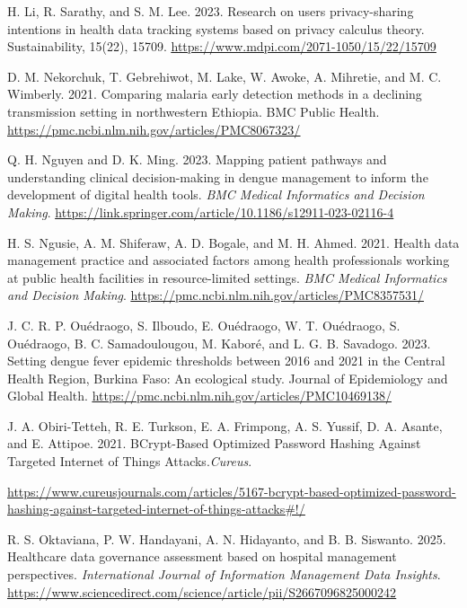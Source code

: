 \documentclass[
]{article}
\begin{document}
H. Li, R. Sarathy, and S. M. Lee. 2023. Research on
users\textquotesingle{} privacy-sharing intentions in health data
tracking systems based on privacy calculus theory. Sustainability,
15(22), 15709.
\href{https://www.mdpi.com/2071-1050/15/22/15709}{\ul{https://www.mdpi.com/2071-1050/15/22/15709}}

D. M. Nekorchuk, T. Gebrehiwot, M. Lake, W. Awoke, A. Mihretie, and M.
C. Wimberly. 2021. Comparing malaria early detection methods in a
declining transmission setting in northwestern Ethiopia. BMC Public
Health.
\href{https://pmc.ncbi.nlm.nih.gov/articles/PMC8067323/}{\ul{https://pmc.ncbi.nlm.nih.gov/articles/PMC8067323/}}

Q. H. Nguyen and D. K. Ming. 2023. Mapping patient pathways and
understanding clinical decision-making in dengue management to inform
the development of digital health tools. \emph{BMC Medical Informatics
and Decision Making}.
\href{https://link.springer.com/article/10.1186/s12911-023-02116-4}{\ul{https://link.springer.com/article/10.1186/s12911-023-02116-4}}

H. S. Ngusie, A. M. Shiferaw, A. D. Bogale, and M. H. Ahmed. 2021.
Health data management practice and associated factors among health
professionals working at public health facilities in resource-limited
settings. \emph{BMC Medical Informatics and Decision Making}.
\href{https://pmc.ncbi.nlm.nih.gov/articles/PMC8357531/}{\ul{https://pmc.ncbi.nlm.nih.gov/articles/PMC8357531/}}

J. C. R. P. Ouédraogo, S. Ilboudo, E. Ouédraogo, W. T. Ouédraogo, S.
Ouédraogo, B. C. Samadoulougou, M. Kaboré, and L. G. B. Savadogo. 2023.
Setting dengue fever epidemic thresholds between 2016 and 2021 in the
Central Health Region, Burkina Faso: An ecological study. Journal of
Epidemiology and Global Health.
\href{https://pmc.ncbi.nlm.nih.gov/articles/PMC10469138/}{\ul{https://pmc.ncbi.nlm.nih.gov/articles/PMC10469138/}}

J. A. Obiri-Tetteh, R. E. Turkson, E. A. Frimpong, A. S. Yussif, D. A.
Asante, and E. Attipoe. 2021. BCrypt-Based Optimized Password Hashing
Against Targeted Internet of Things Attacks.\emph{Cureus}.

\href{https://www.cureusjournals.com/articles/5167-bcrypt-based-optimized-password-hashing-against-targeted-internet-of-things-attacks\#!/}{\ul{https://www.cureusjournals.com/articles/5167-bcrypt-based-optimized-password-hashing-against-targeted-internet-of-things-attacks\#!/}}

R. S. Oktaviana, P. W. Handayani, A. N. Hidayanto, and B. B. Siswanto.
2025. Healthcare data governance assessment based on hospital management
perspectives. \emph{International Journal of Information Management Data
Insights}.
\href{https://www.sciencedirect.com/science/article/pii/S2667096825000242}{\ul{https://www.sciencedirect.com/science/article/pii/S2667096825000242}}
\end{document}
